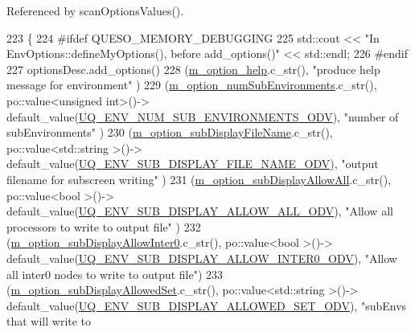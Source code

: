Referenced by scan\-Options\-Values().


\begin{DoxyCode}
223 \{
224 \textcolor{preprocessor}{#ifdef QUESO\_MEMORY\_DEBUGGING}
225 \textcolor{preprocessor}{}  std::cout << \textcolor{stringliteral}{"In EnvOptions::defineMyOptions(), before add\_options()"} << std::endl;
226 \textcolor{preprocessor}{#endif}
227 \textcolor{preprocessor}{}  optionsDesc.add\_options()
228     (\hyperlink{class_q_u_e_s_o_1_1_environment_options_a5db2dbd99ef52563cb42c348ee53ea47}{m\_option\_help}.c\_str(),                                                                   
                                    \textcolor{stringliteral}{"produce help message for  environment"}       )
229     (\hyperlink{class_q_u_e_s_o_1_1_environment_options_a681529984ebb07b3a2b6684cd3416917}{m\_option\_numSubEnvironments}.c\_str(),    po::value<unsigned int>()->
      default\_value(\hyperlink{_environment_options_8h_aa218bd19c1b15600e9fc4aea92000417}{UQ\_ENV\_NUM\_SUB\_ENVIRONMENTS\_ODV}),     \textcolor{stringliteral}{"number of subEnvironments"}      
                     )
230     (\hyperlink{class_q_u_e_s_o_1_1_environment_options_a500c18cec1f5a1f5d89fec2705ef9106}{m\_option\_subDisplayFileName}.c\_str(),    po::value<std::string >()->
      default\_value(\hyperlink{_environment_options_8h_adb73e22ce84a516af0ad8860409588c5}{UQ\_ENV\_SUB\_DISPLAY\_FILE\_NAME\_ODV}),    \textcolor{stringliteral}{"output filename for subscreen
       writing"}         )
231     (\hyperlink{class_q_u_e_s_o_1_1_environment_options_a3ebc67b0780a7c5632461154099ea54b}{m\_option\_subDisplayAllowAll}.c\_str(),    po::value<bool        >()->
      default\_value(\hyperlink{_environment_options_8h_ac435da3ea28649fbfb1f79e08c5e9a45}{UQ\_ENV\_SUB\_DISPLAY\_ALLOW\_ALL\_ODV}),    \textcolor{stringliteral}{"Allow all processors to write
       to output file"}  )
232     (\hyperlink{class_q_u_e_s_o_1_1_environment_options_acf680dfdb7d9d91d0154a65d973359a8}{m\_option\_subDisplayAllowInter0}.c\_str(), po::value<bool        >()->
      default\_value(\hyperlink{_environment_options_8h_a848e049bac92957c3bf2b4897d70557f}{UQ\_ENV\_SUB\_DISPLAY\_ALLOW\_INTER0\_ODV}), \textcolor{stringliteral}{"Allow all inter0 nodes to
       write to output file"})
233     (\hyperlink{class_q_u_e_s_o_1_1_environment_options_aaf46a8974310e00a7569c004736a0f2b}{m\_option\_subDisplayAllowedSet}.c\_str(),  po::value<std::string >()->
      default\_value(\hyperlink{_environment_options_8h_a7a7226f5e2f79219b66071c97099fcb4}{UQ\_ENV\_SUB\_DISPLAY\_ALLOWED\_SET\_ODV}),  \textcolor{stringliteral}{"subEnvs that will write to
}
\end{DoxyCode}
